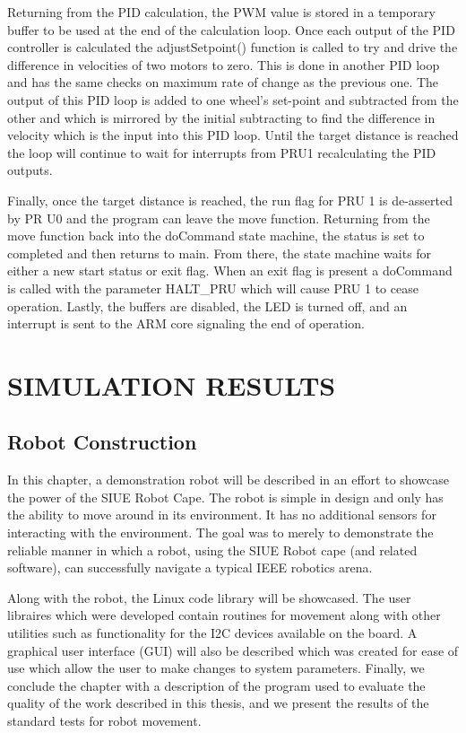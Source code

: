 \documentclass[12pt,oneside,final]{siuethesis}
\theoremstyle{definition}
\begin{document}
Returning from the PID calculation, the PWM value is stored in a temporary buffer to be used at the end of the calculation loop. Once each output of the PID controller is calculated the adjustSetpoint() function is called to try and drive the difference in velocities of two motors to zero. This is done in another PID loop and has the same checks on maximum rate of change as the previous one. The output of this PID loop is added to one wheel's set-point and subtracted from the other and which is mirrored by the initial subtracting to find the difference in velocity which is the input into this PID loop. Until the target distance is reached the loop will continue to wait for interrupts from PRU1 recalculating the PID outputs. 

Finally, once the target distance is reached, the run flag for PRU 1 is de-asserted by PR U0 and the program can leave the move function. Returning from the move function back into the doCommand state machine, the status is set to completed and then returns to main. From there, the state machine waits for either a new start status or exit flag. When an exit flag is present a doCommand is called with the parameter HALT\_PRU which will cause PRU 1 to cease operation.  Lastly, the buffers are disabled, the LED is turned off, and an interrupt is sent to the ARM core signaling the end of operation.

\chapter{SIMULATION RESULTS}

\section{Robot Construction}

In this chapter, a demonstration robot will be described in an effort to showcase the power of the SIUE Robot Cape. The robot is simple in design and only has the ability to move around in its environment. It has no additional sensors for interacting with the environment. The goal was to merely to demonstrate the reliable manner in which a robot, using the SIUE Robot cape (and related software), can successfully navigate a typical IEEE robotics arena. 

Along with the robot, the Linux code library will be showcased.  The user libraires which were developed contain routines for movement along with other utilities such as functionality for the I2C devices available on the board. A graphical user interface (GUI) will also be described which was created for ease of use which allow the user to make changes to system parameters. Finally, we conclude the chapter with a description of the program used to evaluate the quality of the work described in this thesis, and we present the results of the standard tests for robot movement.
\end{document}
